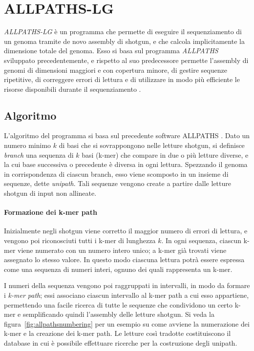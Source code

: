 \documentclass[crop=false, class=book]{standalone}
\begin{document}
	
	
	\section{ALLPATHS-LG}
	\textit{ALLPATHS-LG} è un programma che permette di eseguire il sequenziamento di un genoma tramite de novo assembly di shotgun, e che calcola implicitamente la dimensione totale del genoma. Esso si basa sul programma \textit{ALLPATHS} \cite{butler2008allpaths,maccallum2009allpaths2} sviluppato precedentemente, e rispetto al suo predecessore permette l'assembly di genomi di dimensioni maggiori e con copertura minore, di gestire sequenze ripetitive, di correggere errori di lettura e di utilizzare in modo più efficiente le risorse disponibili durante il sequenziamento \cite{gnerre2011high}. 
	
	
	\subsection{Algoritmo}
	L'algoritmo del programma si basa sul precedente software ALLPATHS \cite{butler2008allpaths}. Dato un numero minimo $k$ di basi che si sovrappongono nelle letture shotgun, si definisce \textit{branch} una sequenza di $k$ basi (k-mer) che compare in due o più letture diverse, e la cui base successiva o precedente è diversa in ogni lettura. Spezzando il genoma in corrispondenza di ciascun branch, esso viene scomposto in un insieme di sequenze, dette \textit{unipath}. Tali sequenze vengono create a partire dalle letture shotgun di input non allineate. 
	
	\paragraph{Formazione dei k-mer path}
	Inizialmente negli shotgun viene corretto il maggior numero di errori di lettura, e vengono poi riconosciuti tutti i k-mer di lunghezza $k$. In ogni sequenza, ciascun k-mer viene numerato con un numero intero unico; a k-mer già trovati viene assegnato lo stesso valore. In questo modo ciascuna lettura potrà essere espressa come una sequenza di numeri interi, ognuno dei quali rappresenta un k-mer. 
	
	I numeri della sequenza vengono poi raggruppati in intervalli, in modo da formare i \textit{k-mer path}; essi associano ciascun intervallo al k-mer path a cui esso appartiene, permettendo una facile ricerca di tutte le sequenze che condividono un certo k-mer e semplificando quindi l'assembly delle letture shotgun. Si veda la figura~\vref{fig:allpathsnumbering} per un esempio su come avviene la numerazione dei k-mer e la creazione dei k-mer path.
	Le letture così tradotte costituiscono il database in cui è possibile effettuare ricerche per la costruzione degli unipath.
	
\end{document}
